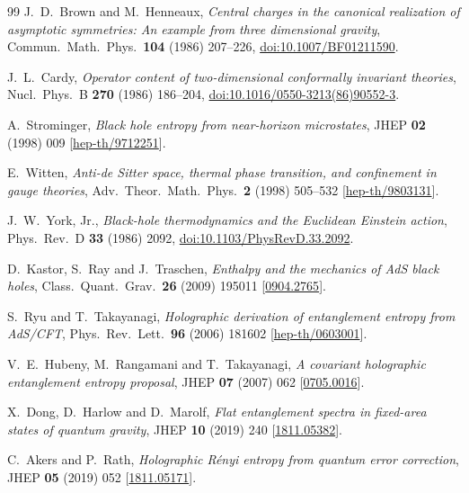 \documentclass[11pt,letterpaper]{article}
\theoremstyle{plain}
\theoremstyle{definition}
\theoremstyle{remark}
\begin{document}
\begin{thebibliography}{99}
J.~D.~Brown and M.~Henneaux,
\emph{Central charges in the canonical realization of asymptotic symmetries: An example from three dimensional gravity},
Commun.\ Math.\ Phys.\ \textbf{104} (1986) 207--226,
\href{https://doi.org/10.1007/BF01211590}{doi:10.1007/BF01211590}.

J.~L.~Cardy, \emph{Operator content of two-dimensional conformally invariant theories},
Nucl.\ Phys.\ B \textbf{270} (1986) 186--204,
\href{https://doi.org/10.1016/0550-3213(86)90552-3}{doi:10.1016/0550-3213(86)90552-3}.

A.~Strominger, \emph{Black hole entropy from near-horizon microstates},
JHEP \textbf{02} (1998) 009
[\href{https://arxiv.org/abs/hep-th/9712251}{hep-th/9712251}].

E.~Witten, \emph{Anti-de Sitter space, thermal phase transition, and confinement in gauge theories},
Adv.\ Theor.\ Math.\ Phys.\ \textbf{2} (1998) 505--532
[\href{https://arxiv.org/abs/hep-th/9803131}{hep-th/9803131}].

J.~W.~York, Jr., \emph{Black-hole thermodynamics and the Euclidean Einstein action},
Phys.\ Rev.\ D \textbf{33} (1986) 2092,
\href{https://doi.org/10.1103/PhysRevD.33.2092}{doi:10.1103/PhysRevD.33.2092}.

D.~Kastor, S.~Ray and J.~Traschen,
\emph{Enthalpy and the mechanics of AdS black holes},
Class.\ Quant.\ Grav.\ \textbf{26} (2009) 195011
[\href{https://arxiv.org/abs/0904.2765}{0904.2765}].

S.~Ryu and T.~Takayanagi, \emph{Holographic derivation of entanglement entropy from AdS/CFT},
Phys.\ Rev.\ Lett.\ \textbf{96} (2006) 181602
[\href{https://arxiv.org/abs/hep-th/0603001}{hep-th/0603001}].

V.~E.~Hubeny, M.~Rangamani and T.~Takayanagi, \emph{A covariant holographic entanglement entropy proposal},
JHEP \textbf{07} (2007) 062
[\href{https://arxiv.org/abs/0705.0016}{0705.0016}].

X.~Dong, D.~Harlow and D.~Marolf, \emph{Flat entanglement spectra in fixed-area states of quantum gravity},
JHEP \textbf{10} (2019) 240
[\href{https://arxiv.org/abs/1811.05382}{1811.05382}].

C.~Akers and P.~Rath, \emph{Holographic R\'enyi entropy from quantum error correction},
JHEP \textbf{05} (2019) 052
[\href{https://arxiv.org/abs/1811.05171}{1811.05171}].


\end{thebibliography}
\end{document}
